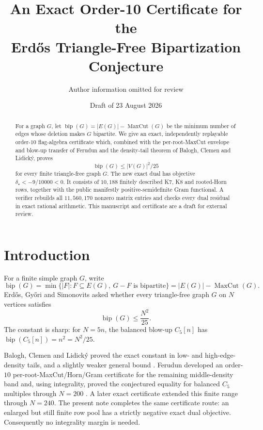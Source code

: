 \documentclass[11pt]{article}
\title{An Exact Order-10 Certificate for the\\
Erd\H{o}s Triangle-Free Bipartization Conjecture}
\author{Author information omitted for review}
\date{Draft of 23 August 2026}
\newcommand{\bip}{\operatorname{bip}}
\newcommand{\mc}{\operatorname{MaxCut}}
\begin{document}
\maketitle

\begin{abstract}
For a graph $G$, let $\bip(G)=|E(G)|-\mc(G)$ be the minimum number of
edges whose deletion makes $G$ bipartite.  We give an exact, independently
replayable order-$10$ flag-algebra certificate which, combined with the
per-root-MaxCut envelope and blow-up transfer of Ferudun and the density-tail
theorem of Balogh, Clemen and Lidick\'y, proves
\[
  \bip(G)\le |V(G)|^2/25
\]
for every finite triangle-free graph $G$.  The new exact dual has objective
$\delta_\star<-9/10000<0$.  It consists of
$10{,}188$ finitely described K7, K8 and rooted-Horn rows, together with the
public manifestly positive-semidefinite Gram functional.  A verifier rebuilds
all $11{,}560{,}170$ nonzero matrix entries and checks every dual residual in
exact rational arithmetic.  This manuscript and certificate are a draft for
external review.
\end{abstract}

\section{Introduction}

For a finite simple graph $G$, write
\[
  \bip(G)=\min\{|F|:F\subseteq E(G),\ G-F\text{ is bipartite}\}
          =|E(G)|-\mc(G).
\]
Erd\H{o}s, Gy\H{o}ri and Simonovits asked whether every triangle-free graph
$G$ on $N$ vertices satisfies
\begin{equation}\label{eq:main}
  \bip(G)\le \frac{N^2}{25}.
\end{equation}
The constant is sharp: for $N=5n$, the balanced blow-up $C_5[n]$ has
$\bip(C_5[n])=n^2=N^2/25$.

Balogh, Clemen and Lidick\'y proved the exact constant in low- and
high-edge-density tails, and a slightly weaker general bound
\cite{BCL}.  Ferudun developed an order-$10$ per-root-MaxCut/Horn/Gram
certificate for the remaining middle-density band and, using integrality,
proved the conjectured equality for balanced $C_5$ multiples through
$N=200$ \cite{Ferudun}.  A later exact certificate extended this finite range
through $N=240$.  The present note completes the same certificate route: an
enlarged but still finite row pool has a strictly negative exact dual
objective.  Consequently no integrality margin is needed.
\end{document}
